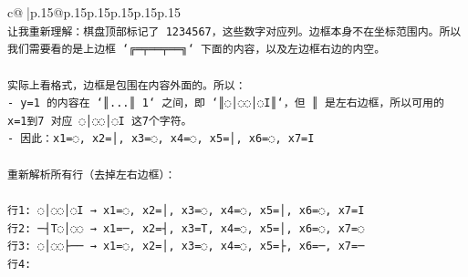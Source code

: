 \documentclass{article}
\begin{document}
{\begin{supertabular}{c@{$\;$}|p{.15\linewidth}@{}p{.15\linewidth}p{.15\linewidth}p{.15\linewidth}p{.15\linewidth}p{.15\linewidth}}
{{{\\ 
\texttt{让我重新理解：棋盘顶部标记了 1234567，这些数字对应列。边框本身不在坐标范围内。所以我们需要看的是上边框 `╔═╤══╤══╗` 下面的内容，以及左边框右边的内空。} \\
\\ 
\texttt{实际上看格式，边框是包围在内容外面的。所以：} \\
\texttt{{-} y=1 的内容在 `║...║ 1` 之间，即 `║◌│◌◌│◌I║`，但 ║ 是左右边框，所以可用的 x=1到7 对应 ◌│◌◌│◌I 这7个字符。} \\
\texttt{{-} 因此：x1=◌, x2=│, x3=◌, x4=◌, x5=│, x6=◌, x7=I} \\
\\ 
\texttt{重新解析所有行（去掉左右边框）：} \\
\\ 
\texttt{行1: ◌│◌◌│◌I  → x1=◌, x2=│, x3=◌, x4=◌, x5=│, x6=◌, x7=I} \\
\texttt{行2: ─┤T◌│◌◌ → x1=─, x2=┤, x3=T, x4=◌, x5=│, x6=◌, x7=◌} \\
\texttt{行3: ◌│◌◌├── → x1=◌, x2=│, x3=◌, x4=◌, x5=├, x6=─, x7=─} \\
\texttt{行4:} \\
            }
        }
    }
     \\ \\


\end{supertabular}}
\end{document}

